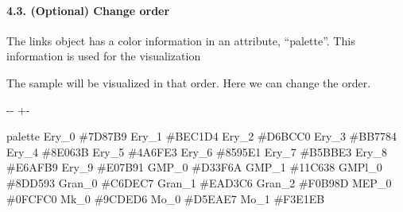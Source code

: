 \documentclass[letterpaper,10pt,english]{sphinxmanual}
\newlength\nbsphinxcodecellspacing
\begin{document}
\paragraph{4.3. (Optional) Change order}
\label{\detokenize{notebooks/04_Network_analysis/Network_analysis_with_with_Paul_etal_2015_data:4.3.-(Optional)-Change-order}}
The links object has a color information in an attribute, “palette”. This information is used for the visualization

The sample will be visualized in that order. Here we can change the order.

{
\begin{sphinxVerbatim}[commandchars=\\\{\}]
\llap{\color{nbsphinxin}[16]:\,\hspace{\fboxrule}\hspace{\fboxsep}}
\end{sphinxVerbatim}
}

{

\kern-\sphinxverbatimsmallskipamount\kern-\baselineskip
\kern+\FrameHeightAdjust\kern-\fboxrule
\vspace{\nbsphinxcodecellspacing}

\begin{sphinxVerbatim}[commandchars=\\\{\}]
\llap{\color{nbsphinxout}[16]:\,\hspace{\fboxrule}\hspace{\fboxsep}}        palette
Ery\_0   \#7D87B9
Ery\_1   \#BEC1D4
Ery\_2   \#D6BCC0
Ery\_3   \#BB7784
Ery\_4   \#8E063B
Ery\_5   \#4A6FE3
Ery\_6   \#8595E1
Ery\_7   \#B5BBE3
Ery\_8   \#E6AFB9
Ery\_9   \#E07B91
GMP\_0   \#D33F6A
GMP\_1   \#11C638
GMPl\_0  \#8DD593
Gran\_0  \#C6DEC7
Gran\_1  \#EAD3C6
Gran\_2  \#F0B98D
MEP\_0   \#0FCFC0
Mk\_0    \#9CDED6
Mo\_0    \#D5EAE7
Mo\_1    \#F3E1EB
\end{sphinxVerbatim}
}
\end{document}
